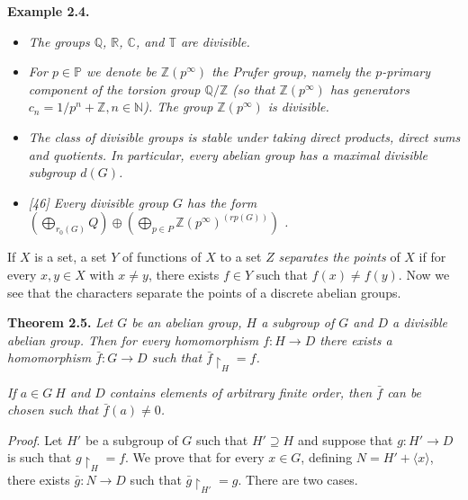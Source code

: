 \documentclass[12pt]{article}
\begin{document}
\textbf{Example 2.4.}


    \begin{itemize}

        \item \emph{The groups $ \mathbb{Q} $, $ \mathbb{R} $, $ \mathbb{C} $, and $ \mathbb{T} $ are divisible.}

        \item \emph{For $ p \in \mathbb{P} $ we denote be $ \mathbb{Z} (p^{\infty}) $ the Prufer group, namely the $p$-primary component of the torsion group
        $ \mathbb{Q} / \mathbb{Z} $ (so that $ \mathbb{Z} (p^{\infty})$ has generators $ c_n = 1/p^{n} + \mathbb{Z}, n \in \mathbb{N} $). The group $ \mathbb{Z}(p^{\infty}) $ is divisible.}

        \item \emph{The class of divisible groups is stable under taking direct products, direct sums and quotients.
        In particular, every abelian group has a maximal divisible subgroup $d(G)$.}

        \item \emph{[46] Every divisible group $ G $ has the form $(\bigoplus_{ r_{0} (G) } Q) \oplus (\bigoplus_{p \in P} \mathbb{Z} (p^{\infty})^ {(rp(G))} )$ .}

    \end{itemize}


    If $X$ is a set, a set $Y$ of functions of $X$ to a set $Z$ \emph{separates the points} of $X$ if for every $x, y \in X$ with $x \neq y$,
there exists $f \in Y$ such that $f(x) \neq f(y)$. Now we see that the characters separate the points of a discrete
abelian groups.


\textbf{Theorem 2.5.} \emph{Let $ G $ be an abelian group, $ H $ a subgroup of $ G $ and $ D $ a divisible abelian group. Then for every
homomorphism $ f : H \to D $ there exists a homomorphism $ \bar{f} : G \to D $ such that $ \bar{f} \upharpoonright_{H} = f $.}


    \emph{If $ a \in G \ H $ and $ D $ contains elements of arbitrary finite order, then $ \bar{f} $ can be chosen such that $ \bar{f} (a) \neq 0 $.}


    \emph{Proof}. Let $ H' $ be a subgroup of $ G $ such that $H' \supseteq H $ and suppose that $ g : H' \to D $ is such that $ g \upharpoonright_{H} = f $. We
prove that for every $ x \in G $, defining $ N = H' + \langle x \rangle $, there exists $ \bar{g} : N \to D $ such that  $ \bar{g} \upharpoonright_{H'} = g $. There are two
cases.
\end{document}
